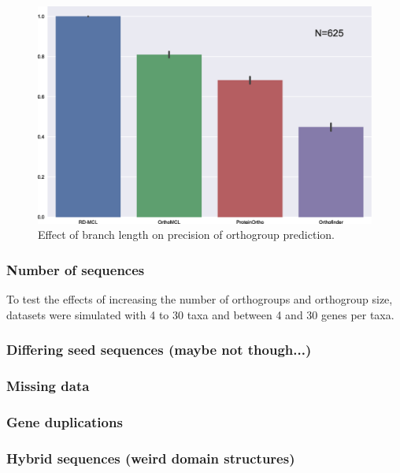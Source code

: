 \documentclass[twocolumn]{bmcart}%
\begin{document}
\begin{figure}[t]
  \begin{center}
  \includegraphics[height=0.22\textheight]{../figures/branch_len_bargraph.eps}
\end{center}
\caption{Effect of branch length on precision of orthogroup prediction.}
\label{fig:branch_len_std}
\end{figure}


\subsubsection{Number of sequences}
To test the effects of increasing the number of orthogroups and orthogroup size, datasets were simulated with 4 to 30 taxa and between 4 and 30 genes per taxa.

\subsubsection{Differing seed sequences (maybe not though...)}
\lipsum[2]

\subsubsection{Missing data}
\lipsum[1]

\subsubsection{Gene duplications}
\lipsum[1]

\subsubsection{Hybrid sequences (weird domain structures)}
\lipsum[1]
\end{document}

